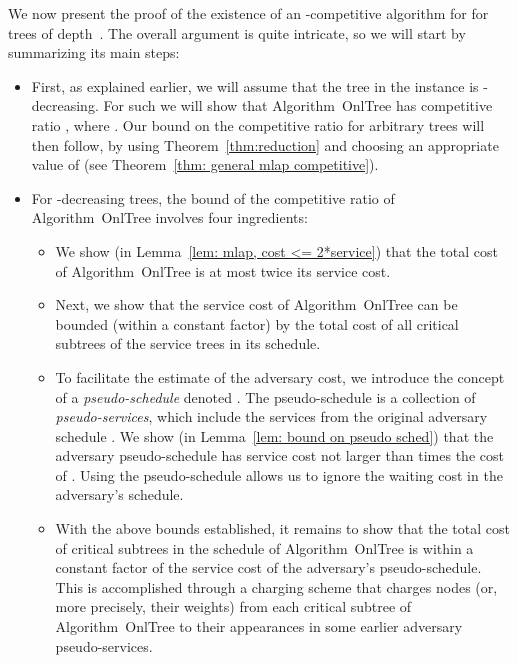 \documentclass[a4paper]{article}
\newcommand{\OnAlgTreesGeneral}{{\sc OnlTree}}
\begin{document}
We now present the proof of the existence of an
-competitive algorithm for  for
trees of depth~. The overall argument is quite intricate, so we 
will start by summarizing its main steps:

\begin{itemize}

\item First, as explained earlier, we will assume that the tree
 in the instance is -decreasing. 
For such  we will show that Algorithm~{\OnAlgTreesGeneral}
has competitive ratio , where
. Our bound on the competitive ratio for
arbitrary trees will then follow, by using Theorem~\ref{thm:reduction}
and choosing an appropriate value of  (see Theorem~\ref{thm: general mlap competitive}).

\item For -decreasing trees,
	the bound of the competitive ratio of Algorithm~{\OnAlgTreesGeneral}
	involves four ingredients:
	
	\begin{itemize}
		
		\item We show (in Lemma~\ref{lem: mlap, cost <= 2*service})
		that the total cost of Algorithm~{\OnAlgTreesGeneral}
			is at most twice its service cost.
			
		\item Next, we show that the service cost of
			Algorithm~{\OnAlgTreesGeneral} can be bounded 
			(within a constant factor) by the total cost of all
			critical subtrees  of the service trees in its schedule.
			
		\item To facilitate the estimate of the adversary cost, 
			we introduce the concept of a \emph{pseudo-schedule}
			denoted . The pseudo-schedule
                         is a collection of 
			\emph{pseudo-services}, which include the services
			from the original adversary schedule .
			We show (in Lemma~\ref{lem: bound on pseudo sched})
			that the adversary pseudo-schedule has service
			cost not larger than  times the cost of .
			Using the pseudo-schedule allows us to ignore the waiting cost in the
			adversary's schedule.
			
		\item With the above bounds established, it remains to
			show that the total cost of critical subtrees in the
			schedule of Algorithm~{\OnAlgTreesGeneral}
			is within a constant factor of the service cost of the
			adversary's	pseudo-schedule. This is accomplished through a 
			charging scheme that charges nodes (or, more precisely,
			their weights) from each critical subtree of
			Algorithm~{\OnAlgTreesGeneral} to their appearances
			in some earlier adversary pseudo-services.
		
	\end{itemize}
	
\end{itemize}
\end{document}
